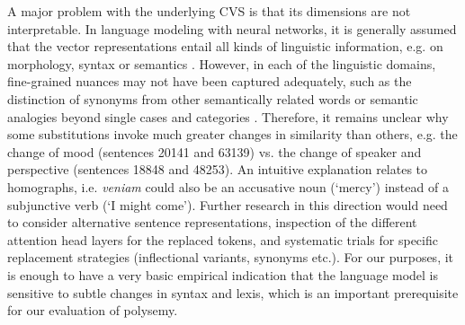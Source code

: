 A major problem with the underlying \gls{CVS} is that its dimensions are not interpretable. In language modeling with neural networks, it is generally assumed that the vector representations entail all kinds of linguistic information, e.g. on morphology, syntax or semantics \parencites[8]{gladkovaAnalogybasedDetectionMorphological2016}[143]{rogersTooManyProblems2017}. However, in each of the linguistic domains, fine-grained nuances may not have been captured adequately, such as the distinction of synonyms from other semantically related words \parencite[115]{karanDistributionalSemanticsApproach2012} or semantic analogies beyond single cases and categories \parencite[142f.]{rogersTooManyProblems2017}. Therefore, it remains unclear why some substitutions invoke much greater changes in similarity than others, e.g. the change of mood (sentences 20141 and 63139) vs. the change of speaker and perspective (sentences 18848 and 48253). An intuitive explanation relates to homographs, i.e. \textit{veniam} could also be an accusative noun (`mercy') instead of a subjunctive verb (`I might come'). Further research in this direction would need to consider alternative sentence representations, inspection of the different attention head layers for the replaced tokens, and systematic trials for specific replacement strategies (inflectional variants, synonyms etc.). For our purposes, it is enough to have a very basic empirical indication that the language model is sensitive to subtle changes in syntax and lexis, which is an important prerequisite for our evaluation of polysemy.

